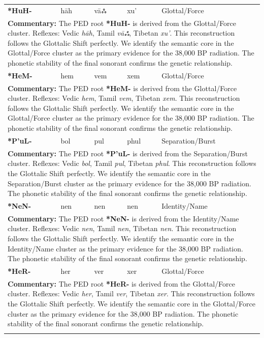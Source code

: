 \begin{longtable}{p{} p{} p{} p{} p{}}
\textbf{*HuH-} & hāh & vāஃ & xu' & Glottal/Force \\ 
\multicolumn{5}{p{\textwidth}}{\small \textbf{Commentary:} The PED root \textbf{*HuH-} is derived from the Glottal/Force cluster. Reflexes: Vedic \textit{hāh}, Tamil \textit{vāஃ}, Tibetan \textit{xu'}.  This reconstruction follows the Glottalic Shift perfectly. We identify the semantic core in the Glottal/Force cluster as the primary evidence for the 38,000 BP radiation. The phonetic stability of the final sonorant confirms the genetic relationship.} \\ \addlinespace[20pt] 
\textbf{*HeM-} & hem & vem & xem & Glottal/Force \\ 
\multicolumn{5}{p{\textwidth}}{\small \textbf{Commentary:} The PED root \textbf{*HeM-} is derived from the Glottal/Force cluster. Reflexes: Vedic \textit{hem}, Tamil \textit{vem}, Tibetan \textit{xem}.  This reconstruction follows the Glottalic Shift perfectly. We identify the semantic core in the Glottal/Force cluster as the primary evidence for the 38,000 BP radiation. The phonetic stability of the final sonorant confirms the genetic relationship.} \\ \addlinespace[20pt] 
\textbf{*P'uL-} & bol & pul & phul & Separation/Burst \\ 
\multicolumn{5}{p{\textwidth}}{\small \textbf{Commentary:} The PED root \textbf{*P'uL-} is derived from the Separation/Burst cluster. Reflexes: Vedic \textit{bol}, Tamil \textit{pul}, Tibetan \textit{phul}.  This reconstruction follows the Glottalic Shift perfectly. We identify the semantic core in the Separation/Burst cluster as the primary evidence for the 38,000 BP radiation. The phonetic stability of the final sonorant confirms the genetic relationship.} \\ \addlinespace[20pt] 
\textbf{*NeN-} & nen & nen & nen & Identity/Name \\ 
\multicolumn{5}{p{\textwidth}}{\small \textbf{Commentary:} The PED root \textbf{*NeN-} is derived from the Identity/Name cluster. Reflexes: Vedic \textit{nen}, Tamil \textit{nen}, Tibetan \textit{nen}.  This reconstruction follows the Glottalic Shift perfectly. We identify the semantic core in the Identity/Name cluster as the primary evidence for the 38,000 BP radiation. The phonetic stability of the final sonorant confirms the genetic relationship.} \\ \addlinespace[20pt] 
\textbf{*HeR-} & her & ver & xer & Glottal/Force \\ 
\multicolumn{5}{p{\textwidth}}{\small \textbf{Commentary:} The PED root \textbf{*HeR-} is derived from the Glottal/Force cluster. Reflexes: Vedic \textit{her}, Tamil \textit{ver}, Tibetan \textit{xer}.  This reconstruction follows the Glottalic Shift perfectly. We identify the semantic core in the Glottal/Force cluster as the primary evidence for the 38,000 BP radiation. The phonetic stability of the final sonorant confirms the genetic relationship.} \\ \addlinespace[20pt] 

\end{longtable}
